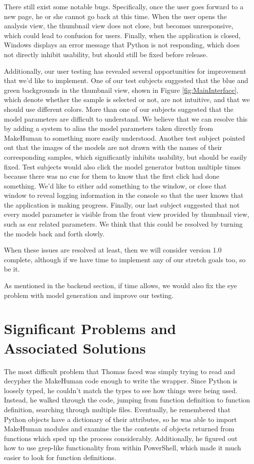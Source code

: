 \documentclass[letterpaper,10pt, onecolumn, draftclsnofoot]{IEEEtran}
\begin{document}
There still exist some notable bugs. Specifically, once the user goes forward to a new page, he or she cannot go back at this time. When the user opens the analysis view, the thumbnail view does not close, but becomes unresponsive, which could lead to confusion for users. Finally, when the application is closed, Windows displays an error message that Python is not responding, which does not directly inhibit usability, but should still be fixed before release.

Additionally, our user testing has revealed several opportunities for improvement that we'd like to implement. One of our test subjects suggested that the blue and green backgrounds in the thumbnail view, shown in Figure \ref{fig:MainInterface}, which denote whether the sample is selected or not, are not intuitive, and that we should use different colors. More than one of our subjects suggested that the model parameters are difficult to understand. We believe that we can resolve this by adding a system to alias the model parameters taken directly from MakeHuman to something more easily understood. Another test subject pointed out that the images of the models are not drawn with the names of their corresponding samples, which significantly inhibits usability, but should be easily fixed. Test subjects would also click the model generator button multiple times because there was no cue for them to know that the first click had done something. We'd like to either add something to the window, or close that window to reveal logging information in the console so that the user knows that the application is making progress. Finally, our last subject suggested that not every model parameter is visible from the front view provided by thumbnail view, such as ear related parameters. We think that this could be resolved by turning the models back and forth slowly.

When these issues are resolved at least, then we will consider version 1.0 complete, although if we have time to implement any of our stretch goals too, so be it.

As mentioned in the backend section, if time allows, we would also fix the eye problem with model generation and improve our testing.



\section{Significant Problems and Associated Solutions}

The most difficult problem that Thomas faced was simply trying to read and decypher the MakeHuman code enough to write the wrapper. Since Python is loosely typed, he couldn't match the types to see how things were being used. Instead, he walked through the code, jumping from function definition to function definition, searching through multiple files. Eventually, he remembered that Python objects have a dictionary of their attributes, so he was able to import MakeHuman modules and examine the the contents of objects returned from functions which sped up the process considerably. Additionally, he figured out how to use grep-like functionality from within PowerShell, which made it much easier to look for function definitions.
\end{document}
